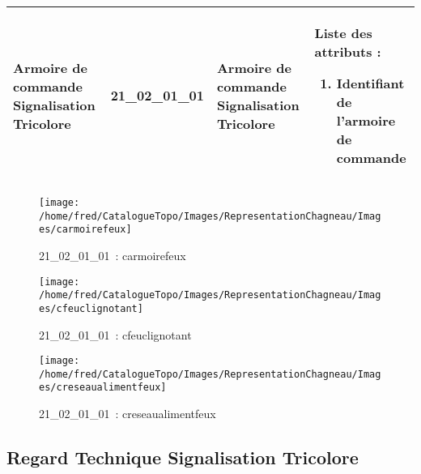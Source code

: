 \documentclass[12pt,titlepage]{book}
\begin{document}
\renewcommand{\arraystretch}{1.2}
\begin{supertabular}{|p{10cm}|c|p{13cm}|p{12cm}|}
 Armoire de commande Signalisation Tricolore & 21\_02\_01\_01 & Armoire de commande Signalisation Tricolore & Liste des attributs :
\begin{enumerate}
  \item Identifiant de l'armoire de commande\end{enumerate}
\\
\hline
\end{supertabular}
\begin{figure}[h!]
  \hfill         %
  \begin{minipage}[t]{3cm}
    \begin{center}
      \texttt{[image: /home/fred/CatalogueTopo/Images/RepresentationChagneau/Images/carmoirefeux]}
      \caption[~21\_02\_01\_01]{\small{21\_02\_01\_01~:} \tiny{carmoirefeux}}\label{carmoirefeux}
    \end{center}
  \end{minipage}
  \begin{minipage}[t]{3cm}
    \begin{center}
      \texttt{[image: /home/fred/CatalogueTopo/Images/RepresentationChagneau/Images/cfeuclignotant]}
      \caption[~21\_02\_01\_01]{\small{21\_02\_01\_01~:} \tiny{cfeuclignotant}}\label{cfeuclignotant}
    \end{center}
  \end{minipage}
  \begin{minipage}[t]{3cm}
    \begin{center}
      \texttt{[image: /home/fred/CatalogueTopo/Images/RepresentationChagneau/Images/creseaualimentfeux]}
      \caption[~21\_02\_01\_01]{\small{21\_02\_01\_01~:} \tiny{creseaualimentfeux}}\label{creseaualimentfeux}
    \end{center}
  \end{minipage}
\end{figure}


\subsection{Regard Technique Signalisation Tricolore}
\noindent
\vspace{\baselineskip}
\end{document}
